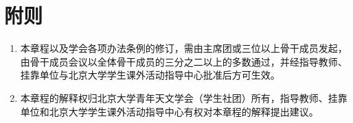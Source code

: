 \section{附则}

\begin{enumerate}[resume]
    \item 本章程以及学会各项办法条例的修订，需由主席团或三位以上骨干成员发起，由骨干成员会议以全体骨干成员的三分之二以上的多数通过，并经指导教师、挂靠单位与北京大学学生课外活动指导中心批准后方可生效。
    
    \item 本章程的解释权归北京大学青年天文学会（学生社团）所有，指导教师、挂靠单位和北京大学学生课外活动指导中心有权对本章程的解释提出建议。
\end{enumerate}